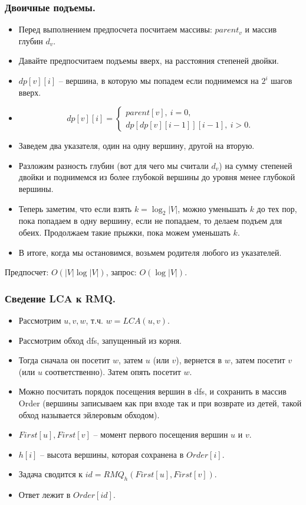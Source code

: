 \documentclass[a4paper,14pt]{article}
\begin{document}
    \subsubsection*{Двоичные подъемы.}
    \begin{itemize}
        \item Перед выполнением предпосчета посчитаем массивы: $parent_v$ и
        массив глубин $d_v$.
        \item Давайте предпосчитаем подъемы вверх, на расстояния степеней
        двойки.
        \item $dp[v][i]$ -- вершина, в которую мы попадем если поднимемся на $2^i$ шагов вверх.
        \item \[dp[v][i]=\left\{
        \begin{array}{l}
            parent[v], \ i=0, \\
            dp[dp[v][i-1]][i-1], \ i>0.
        \end{array}
        \right.\]
        \item Заведем два указателя, один на одну вершину, другой на вторую.
        \item Разложим разность глубин (вот для чего мы считали $d_v$) на
        сумму степеней двойки и поднимемся из более глубокой
        вершины до уровня менее глубокой вершины. 
        \item Теперь заметим, что если взять $k = \log_2 |V|$, можно уменьшать
        $k$ до тех пор, пока попадаем в одну вершину, если не попадаем,
        то делаем подъем для обеих. Продолжаем такие прыжки, пока
        можем уменьшать $k$.
        \item В итоге, когда мы остановимся, возьмем родителя любого из
        указателей.
    \end{itemize}
    Предпосчет: $O(|V|\log |V|)$, запрос: $O(\log |V|)$.

    \subsubsection*{Сведение LCA к RMQ.}
    \begin{itemize}
        \item Рассмотрим $u, v, w$, т.ч. $w= LCA(u, v)$.
        \item Рассмотрим обход dfs, запущенный из корня.
        \item Тогда сначала он посетит $w$, затем $u$ (или $v$), вернется в $w$,
        затем посетит $v$ (или $u$ соответственно). Затем опять посетит $w$.
        \item Можно посчитать порядок посещения вершин в dfs, и сохранить
        в массив Order (вершины записываем как при входе так и при
        возврате из детей, такой обход называется эйлеровым обходом).
        \item $First[u],First[v]$ – момент первого посещения вершин $u$ и $v$.
        \item $h[i]$ – высота вершины, которая сохранена в $Order[i]$.
        \item Задача сводится к $id = RMQ_h(First[u],First[v])$.
        \item Ответ лежит в $Order[id]$.
    \end{itemize}
\end{document}
